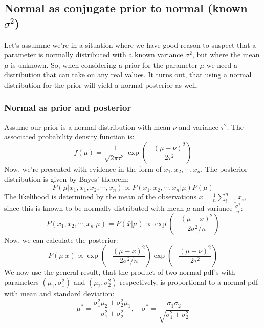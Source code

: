 \documentclass[12pt, a4paper]{article}
\begin{document}
\subsection{Normal as conjugate prior to normal (known $\sigma^2$)}
Let's assumme we're in a situation where we have good reason to suspect that a parameter is normally distributed with a known variance $\sigma^2$, but where the mean $\mu$ is unknown. So, when considering a prior for the parameter $\mu$ we need a distribution that can take on any real values. It turns out, that using a normal distribution for the prior will yield a normal posterior as well.

\subsubsection{Normal as prior and posterior}
Assume our prior is a normal distribution with mean $\nu$ and variance $\tau^2$. The associated probability density function is:
\begin{equation}
f(\mu)=\frac{1}{\sqrt{2\pi\tau^2}}\exp\left(-\frac{(\mu-\nu)^2}{2\tau^2}\right)
\end{equation}
Now, we're presented with evidence in the form of $x_1,x_2,\cdots,x_n$. The posterior distribution is given by Bayes' theorem:
\begin{equation}
P(\mu|x_1,x_1,x_2,\cdots,x_n)\propto P(x_1,x_2,\cdots,x_n|\mu)P(\mu)
\end{equation}
The likelihood is determined by the mean of the observations $\bar{x}=\frac{1}{n}\sum_{i=1}^n x_i$, since this is known to be normally distributed with mean $\mu$ and variance $\frac{\sigma^2}{n}$:
\begin{equation}
P(x_1,x_2,\cdots,x_n|\mu)=P(\bar{x}|\mu)\propto\exp\left(-\frac{(\mu-\bar{x})^2}{2\sigma^2/n}\right)
\end{equation}
Now, we can calculate the posterior:
\begin{equation}
P(\mu|\bar{x})\propto\exp\left(-\frac{(\mu-\bar{x})^2}{2\sigma^2/n}\right)\exp\left(-\frac{(\mu-\nu)^2}{2\tau^2}\right)
\end{equation}
We now use the general result, that the product of two normal pdf's with parameters $(\mu_1,\sigma_1^2)$ and $(\mu_2,\sigma_2^2)$ respectively, is proportional to a normal pdf with mean and standard deviation:
\begin{equation}
\mu^*=\frac{\sigma_1^2\mu_2+\sigma_2^2\mu_1}{\sigma_1^2+\sigma_2^2},\quad\sigma^*=\frac{\sigma_1\sigma_2}{\sqrt{\sigma_1^2+\sigma_2^2}}
\end{equation}
\end{document}
